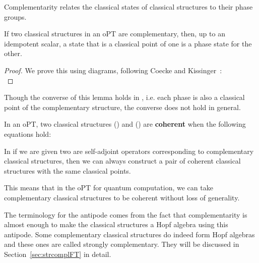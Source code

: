 Complementarity relates the classical states of classical structures to their phase groups.
\begin{lemma}
\label{lem:phaseunbiased}
If two classical structures in an oPT are complementary, then, up to an idempotent scalar, a state that is a classical point of one is a phase state for the other.
\end{lemma}
\begin{proof}
We prove this using diagrams, following Coecke and Kissinger~\cite{qcs-notes}:
\begin{equation}

\end{equation}
\end{proof}
Though the converse of this lemma holds in , i.e. each phase is also a classical point of the complementary structure, the converse does not hold in general.

%

\begin{defn}\label{def:coherence}
In an oPT, two classical structures () and () are \textbf{coherent} when the following equations hold:
\begin{equation}
\label{eq:coherence}
 
\end{equation}
\end{defn}

\begin{proposition}
\label{prop:cohere}
In  if we are given two are self-adjoint operators corresponding to complementary classical structures, then we can always construct a pair of coherent classical structures with the same classical points.
\end{proposition}
\noindent This means that in the oPT for quantum computation, we can take complementary classical structures to be coherent without loss of generality.

The terminology for the antipode comes from the fact that complementarity is almost enough to make the classical structures a Hopf algebra using this antipode. Some complementary classical structures do indeed form Hopf algebras and these ones are called strongly complementary. They will be discussed in Section~\ref{sec:strcomplFT} in detail.


